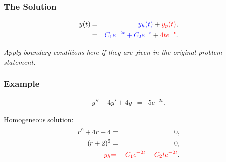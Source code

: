 \begin{frame}
  \frametitle{The Solution}

  \begin{eqnarray*}
    y(t) & = & {\color{blue}y_h(t)} + {\color{red}y_p(t)}, \\
         & = & {\color{blue}C_1 e^{-2t} + C_2 e^{-t}} + {\color{red}4te^{-t}}.
  \end{eqnarray*}

  \textit{Apply boundary conditions here if they are given in the original problem statement.}

\end{frame}

\begin{frame}
  \frametitle{Example}

  \begin{eqnarray*}
    y'' + 4y' + 4y & = & 5 e^{-2t}.
  \end{eqnarray*}

  {
    Homogeneous solution:
    \begin{eqnarray*}
      r^2 + 4r + 4 & = & 0, \\
      (r+2)^2 & = & 0, \\
      {\color{red}y_h} & {\color{red}=} & {\color{red}C_1 e^{-2t} + C_2 t e^{-2t}}.
    \end{eqnarray*}
  }

\end{frame}

